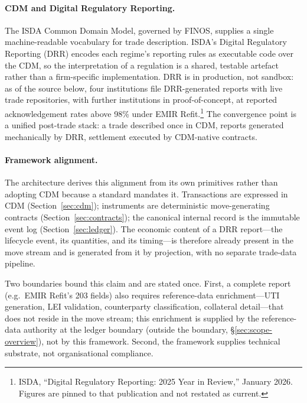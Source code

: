 \documentclass[11pt,a4paper]{article}
\begin{document}
\paragraph{CDM and Digital Regulatory Reporting.}
The ISDA Common Domain Model, governed by FINOS, supplies a single machine-readable vocabulary for trade description. ISDA's Digital Regulatory Reporting (DRR) encodes each regime's reporting rules as executable code over the CDM, so the interpretation of a regulation is a shared, testable artefact rather than a firm-specific implementation. DRR is in production, not sandbox: as of the source below, four institutions file DRR-generated reports with live trade repositories, with further institutions in proof-of-concept, at reported acknowledgement rates above 98\% under EMIR Refit.\footnote{ISDA, ``Digital Regulatory Reporting: 2025 Year in Review,'' January 2026. Figures are pinned to that publication and not restated as current.} The convergence point is a unified post-trade stack: a trade described once in CDM, reports generated mechanically by DRR, settlement executed by CDM-native contracts.

\paragraph{Framework alignment.}
The architecture derives this alignment from its own primitives rather than adopting CDM because a standard mandates it. Transactions are expressed in CDM (Section~\ref{sec:cdm}); instruments are deterministic move-generating contracts (Section~\ref{sec:contracts}); the canonical internal record is the immutable event log (Section~\ref{sec:ledger}). The economic content of a DRR report---the lifecycle event, its quantities, and its timing---is therefore already present in the move stream and is generated from it by projection, with no separate trade-data pipeline.

Two boundaries bound this claim and are stated once. First, a complete report (e.g.\ EMIR Refit's 203 fields) also requires reference-data enrichment---UTI generation, LEI validation, counterparty classification, collateral detail---that does not reside in the move stream; this enrichment is supplied by the reference-data authority at the ledger boundary (outside the boundary, \S\ref{sec:scope-overview}), not by this framework. Second, the framework supplies technical substrate, not organisational compliance.
\end{document}
